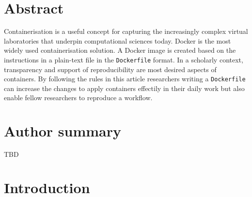 \documentclass[10pt,letterpaper]{article}
\newcommand{\getIndex}[2]{
  \ForEach{,}{\IfEq{#1}{\thislevelitem}{\number\thislevelcount\ExitForEach}{}}{#2}
}
\newcommand{\getAff}[1]{
  \getIndex{#1}{}
}
\begin{document}
\vspace*{0.2in}

\section*{Abstract}
Containerisation is a useful concept for capturing the increasingly
complex virtual laboratories that underpin computational sciences today.
Docker is the most widely used containerisation solution. A Docker image
is created based on the instructions in a plain-text file in the
\texttt{Dockerfile} format. In a scholarly context, transparency and
support of reproducibility are most desired aspects of containers. By
following the rules in this article researchers writing a
\texttt{Dockerfile} can increase the changes to apply containers
effectily in their daily work but also enable fellow researchers to
reproduce a workflow.

\section*{Author summary}
TBD

\linenumbers

\hypertarget{introduction}{%
\section*{Introduction}\label{introduction}}
\end{document}
